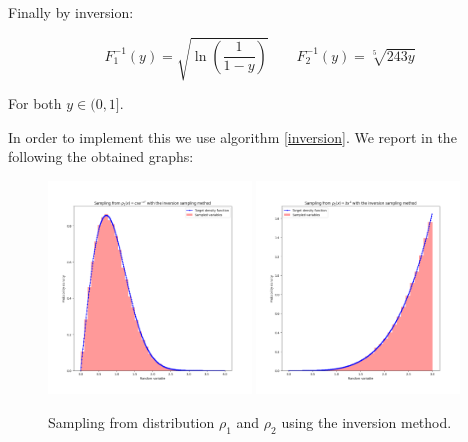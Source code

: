 Finally by inversion:

$$ F^{-1}_1(y) = \sqrt{\ln\left(\frac{1}{1-y}\right)} \qquad F^{-1}_2(y)= \sqrt[5]{243 y}$$

For both $y \in (0,1]$.

In order to implement this we use algorithm \ref{inversion}. We report in the following the obtained graphs:

\begin{figure}[H]
\centering
\includegraphics[width=0.48\textwidth]{FIG/exercise_1_images/Figure_1.png}
\hfill
\includegraphics[width=0.48\textwidth]{FIG/exercise_1_images/Figure_2.png}
\caption{Sampling from distribution $\rho_1$ and $\rho_2$ using the inversion method.}
\label{fig:combined_figure}
\end{figure}